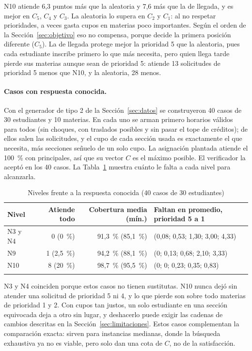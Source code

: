 N10 atiende 6,3 puntos más que la aleatoria y 7,6 más que la de llegada, y es mejor en $C_5$, $C_4$ y $C_3$. La aleatoria lo supera en $C_2$ y $C_1$: al no respetar prioridades, a veces gasta cupos en materias poco importantes. Según el orden de la Sección~\ref{sec:objetivo} eso no compensa, porque decide la primera posición diferente ($C_5$). La de llegada protege mejor la prioridad 5 que la aleatoria, pues cada estudiante inscribe primero lo que más necesita, pero quien llega tarde pierde sus materias aunque sean de prioridad 5: atiende 13 solicitudes de prioridad 5 menos que N10, y la aleatoria, 28 menos.

\paragraph{Casos con respuesta conocida.} Con el generador de tipo 2 de la Sección~\ref{sec:datos} se construyeron 40 casos de 30 estudiantes y 10 materias. En cada uno se arman primero horarios válidos para todos (sin choques, con traslados posibles y sin pasar el tope de créditos); de ellos salen las solicitudes, y el cupo de cada sección usada es exactamente el que necesita, más secciones señuelo de un solo cupo. La asignación plantada atiende el 100~\% con principales, así que su vector $C$ es el máximo posible. El verificador la aceptó en los 40 casos. La Tabla~\ref{tab:conocidos} muestra cuánto le falta a cada nivel para alcanzarla.

\begin{table}[htbp]
\caption{Niveles frente a la respuesta conocida (40 casos de 30 estudiantes)}\label{tab:conocidos}
\small
\begin{tabular*}{\textwidth}{@{\extracolsep\fill}lrrl@{}}
\toprule
Nivel & Atiende todo & Cobertura media (mín.) & Faltan en promedio, prioridad 5 a 1 \\
\midrule
N3 y N4 & 0 (0~\%) & 91,3~\% (85,1~\%) & (0,08; 0,53; 1,30; 3,00; 4,33) \\
N9 & 1 (2,5~\%) & 94,2~\% (88,1~\%) & (0; 0,13; 0,68; 2,10; 3,33) \\
N10 & 8 (20~\%) & 98,7~\% (95,5~\%) & (0; 0; 0,23; 0,35; 0,83) \\
\botrule
\end{tabular*}
\end{table}

N3 y N4 coinciden porque estos casos no tienen sustitutas. N10 nunca dejó sin atender una solicitud de prioridad 5 ni 4, y lo que pierde son sobre todo materias de prioridad 1 y 2. Con cupos tan justos, un solo estudiante en una sección equivocada deja a otro sin lugar, y deshacerlo puede exigir las cadenas de cambios descritas en la Sección~\ref{sec:limitaciones}. Estos casos complementan la comparación exacta: sirven para instancias medianas, donde la búsqueda exhaustiva ya no es viable, pero solo dan una cota de $C$, no de la satisfacción.

